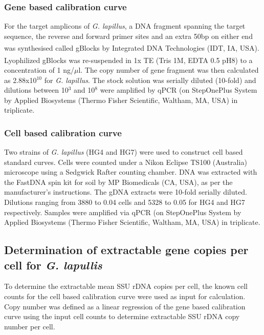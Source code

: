 \documentclass[10pt,letterpaper]{article}
\begin{document}
\subsubsection*{Gene based calibration curve}
For the target amplicons of \emph{G. lapillus}, a DNA fragment spanning the target sequence, the reverse and forward primer sites and an extra 50bp on either end was synthesised called gBlocks \textsuperscript{\textregistered} by Integrated DNA Technologies (IDT, IA, USA). 
Lyophilized gBlocks \textsuperscript{\textregistered} was re-suspended in 1x TE (Tris 1M, EDTA 0.5 pH8) to a concentration of 1 ng/$\mu$l. 
The copy number of gene fragment was then calculated as 2.88x10$^{10}$ for \textit{G. lapillus}. 
The stock solution was serially diluted (10-fold) and dilutions between 10$^{3}$ and 10$^{8}$ were amplified by qPCR (on StepOnePlus System by Applied Biosystems (Thermo Fisher Scientific, Waltham, MA, USA) in triplicate.

\subsubsection*{Cell based calibration curve}
Two strains of \emph{G. lapillus} (HG4 and HG7) were used to construct cell based standard curves. 
Cells were counted under a Nikon Eclipse TS100 (Australia) microscope using a Sedgwick Rafter counting chamber. 
DNA was extracted with the FastDNA spin kit for soil by MP Biomedicals (CA, USA), as per the manufacturer's instructions. 
The gDNA extracts were 10-fold serially diluted. 
Dilutions ranging from 3880 to 0.04 cells and 5328 to 0.05 for HG4 and HG7 respectively.  
Samples were amplified via qPCR (on StepOnePlus System by Applied Biosystems (Thermo Fisher Scientific, Waltham, MA, USA) in triplicate.

\subsection*{Determination of extractable gene copies per cell for \emph{G. lapullis}}

To determine the extractable mean SSU rDNA copies per cell, the known cell counts for the cell based calibration curve were used as input for calculation. 
Copy number was defined as a linear regression of the gene based calibration curve using the input cell counts to determine extractable SSU rDNA copy number per cell.
\end{document}
